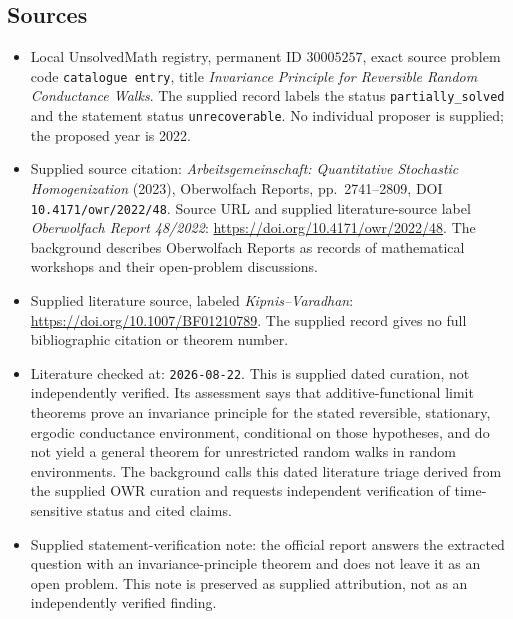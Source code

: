 \documentclass[11pt]{article}
\begin{document}
\subsection{Sources}
\begin{itemize}
\item Local UnsolvedMath registry, permanent ID \(30005257\), exact source problem code \texttt{catalogue entry}, title \emph{Invariance Principle for Reversible Random Conductance Walks}. The supplied record labels the status \texttt{partially\_solved} and the statement status \texttt{unrecoverable}. No individual proposer is supplied; the proposed year is 2022.
\item Supplied source citation: \emph{Arbeitsgemeinschaft: Quantitative Stochastic Homogenization} (2023), Oberwolfach Reports, pp.~2741--2809, DOI \texttt{10.4171/owr/2022/48}. Source URL and supplied literature-source label \emph{Oberwolfach Report 48/2022}: \url{https://doi.org/10.4171/owr/2022/48}. The background describes Oberwolfach Reports as records of mathematical workshops and their open-problem discussions.
\item Supplied literature source, labeled \emph{Kipnis--Varadhan}: \url{https://doi.org/10.1007/BF01210789}. The supplied record gives no full bibliographic citation or theorem number.
\item Literature checked at: \texttt{2026-08-22}. This is supplied dated curation, not independently verified. Its assessment says that additive-functional limit theorems prove an invariance principle for the stated reversible, stationary, ergodic conductance environment, conditional on those hypotheses, and do not yield a general theorem for unrestricted random walks in random environments. The background calls this dated literature triage derived from the supplied OWR curation and requests independent verification of time-sensitive status and cited claims.
\item Supplied statement-verification note: the official report answers the extracted question with an invariance-principle theorem and does not leave it as an open problem. This note is preserved as supplied attribution, not as an independently verified finding.
\end{itemize}
\end{document}
